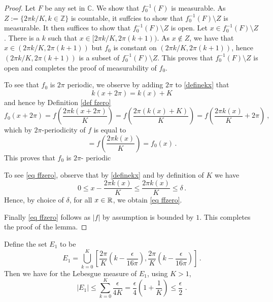 \begin{proof}
Let $F$ be any set in $\mathbb{C}$. We show that
$f_0^{-1}(F)$ is measurable. As
$Z:=\{2\pi k/K, k\in \mathbb{Z}\}$ is countable, it suffcies to show
that $f_0^{-1}(F)\setminus Z$ is measurable. It then
suffices to show that $f_0^{-1}(F)\setminus Z$ is open.
Let $x\in f_0^{-1}(F)\setminus Z$. There is a $k$
such that $x\in [2\pi k/K, 2\pi (k+1))$. As $x\not\in Z$,
we have that $x\in (2\pi k/K, 2\pi (k+1))$
but $f_0$ is constant on $(2\pi k/K, 2\pi (k+1))$,
hence $(2\pi k/K, 2\pi (k+1))$ is a subset of
$f_0^{-1}(F)\setminus Z$. This proves that
$f_0^{-1}(F)\setminus Z$ is open and completes the proof of measurability of $f_0$.




To see that $f_0$ is $2\pi$ periodic, we observe by
adding $2\pi$ to \eqref{definekx} that
\begin{equation}
    k(x+2\pi)=k(x)+K
\end{equation}
and hence by Definition \eqref{def fzero}
\begin{equation}
    f_0(x+2\pi)=f(\frac {2\pi k(x+2\pi)}K)=f(\frac{2\pi (k(x)+K)}{K})
        =f(\frac{2\pi k(x)}K+2\pi)\ ,
\end{equation}
which by $2\pi$-periodicity of $f$ is equal to
\begin{equation}
    =f(\frac{2\pi k(x)}K)=f_0(x)\, .
\end{equation}
    This proves that $f_0$ is $2\pi$- periodic




To see \eqref{eq ffzero}, observe that by \eqref{definekx} and by definition of $K$ we have
\begin{equation}
0\le x-\frac{2\pi k(x)}{K} \le \frac{2\pi k(x)}{K}\le \delta\, .
\end{equation}
Hence, by choice of $\delta$, for all $x\in \mathbb{R}$, we obtain \eqref{eq ffzero}.

Finally \eqref{eq ffzero} follows as $|f|$ by assumption is bounded by $1$.
This completes the proof of the lemma.
\end{proof}

Define the set $E_1$ to be
\begin{equation}
E_1=\bigcup_{k=0}^{K}[\frac{2\pi}K (k-\frac {\epsilon}{16\pi }),
\frac{2\pi}K (k-\frac {\epsilon}{16\pi})]\, .
\end{equation}
Then we have for the Lebesgue measure of $E_1$, using $K>1$,
\begin{equation}
    |E_1|\le \sum_{k=0}^{K}\frac {\epsilon}{4K}= \frac{\epsilon}{4}\left(1+\frac 1K\right)\le \frac \epsilon 2\, \, .
\end{equation}

